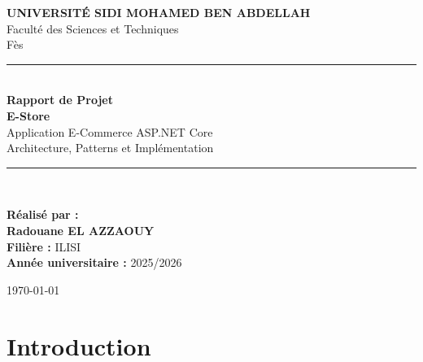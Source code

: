 \documentclass[12pt,a4paper]{article}
\begin{document}
\begin{titlepage}
    \centering
    
    \vspace*{1cm}
    
    {\Large \textbf{UNIVERSITÉ SIDI MOHAMED BEN ABDELLAH}}\\[0.3cm]
    {\large Faculté des Sciences et Techniques}\\[0.2cm]
    {\large Fès}\\[2cm]
    
    \rule{\linewidth}{0.5mm}\\[0.4cm]
    
    {\huge \textbf{Rapport de Projet}}\\[0.5cm]
    {\Large \textbf{E-Store}}\\[0.3cm]
    {\large Application E-Commerce ASP.NET Core}\\[0.2cm]
    {\large Architecture, Patterns et Implémentation}\\[0.4cm]
    
    \rule{\linewidth}{0.5mm}\\[2cm]
    
    \begin{minipage}{0.8\textwidth}
        \centering
        {\large \textbf{Réalisé par :}}\\[0.5cm]
        {\Large \textbf{Radouane EL AZZAOUY}}\\[1cm]
        
        {\large \textbf{Filière :} ILISI}\\[0.3cm]
        {\large \textbf{Année universitaire :} 2025/2026}\\
    \end{minipage}
    
    \vfill
    
    {\large \today}
    
\end{titlepage}

\pagestyle{plain}
\tableofcontents
\newpage

\pagestyle{fancy}

\section{Introduction}
\end{document}
